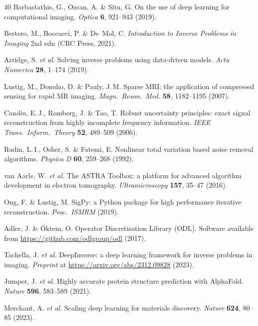 \documentclass[11pt,a4paper]{article}
\begin{document}
\begin{thebibliography}{40}
Barbastathis, G., Ozcan, A. \& Situ, G.
On the use of deep learning for computational imaging.
\textit{Optica} \textbf{6}, 921--943 (2019).

Bertero, M., Boccacci, P. \& De~Mol, C.
\textit{Introduction to Inverse Problems in Imaging} 2nd edn (CRC Press, 2021).

Arridge, S. \textit{et al.}
Solving inverse problems using data-driven models.
\textit{Acta Numerica} \textbf{28}, 1--174 (2019).

Lustig, M., Donoho, D. \& Pauly, J.\,M.
Sparse MRI: the application of compressed sensing for rapid MR imaging.
\textit{Magn.\ Reson.\ Med.} \textbf{58}, 1182--1195 (2007).

Cand{\`e}s, E.\,J., Romberg, J. \& Tao, T.
Robust uncertainty principles: exact signal reconstruction from highly incomplete frequency information.
\textit{IEEE Trans.\ Inform.\ Theory} \textbf{52}, 489--509 (2006).

Rudin, L.\,I., Osher, S. \& Fatemi, E.
Nonlinear total variation based noise removal algorithms.
\textit{Physica D} \textbf{60}, 259--268 (1992).

van Aarle, W. \textit{et al.}
The ASTRA Toolbox: a platform for advanced algorithm development in electron tomography.
\textit{Ultramicroscopy} \textbf{157}, 35--47 (2016).

Ong, F. \& Lustig, M.
SigPy: a Python package for high performance iterative reconstruction.
\textit{Proc.\ ISMRM} (2019).

Adler, J. \& {\"O}ktem, O.
Operator Discretisation Library (ODL).
Software available from \url{https://github.com/odlgroup/odl} (2017).

Tachella, J. \textit{et al.}
DeepInverse: a deep learning framework for inverse problems in imaging.
\textit{Preprint} at \url{https://arxiv.org/abs/2312.09828} (2023).

Jumper, J. \textit{et al.}
Highly accurate protein structure prediction with AlphaFold.
\textit{Nature} \textbf{596}, 583--589 (2021).

Merchant, A. \textit{et al.}
Scaling deep learning for materials discovery.
\textit{Nature} \textbf{624}, 80--85 (2023).


\end{thebibliography}
\end{document}
